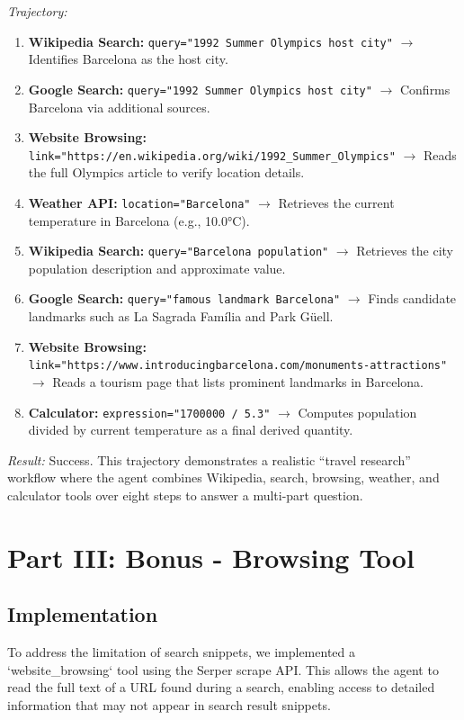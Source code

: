 \documentclass{article}
\begin{document}
\textit{Trajectory:}
\begin{enumerate}
    \item \textbf{Wikipedia Search:} \texttt{query="1992 Summer Olympics host city"} $\rightarrow$ Identifies Barcelona as the host city.
    \item \textbf{Google Search:} \texttt{query="1992 Summer Olympics host city"} $\rightarrow$ Confirms Barcelona via additional sources.
    \item \textbf{Website Browsing:} \texttt{link="https://en.wikipedia.org/wiki/1992\_Summer\_Olympics"} $\rightarrow$ Reads the full Olympics article to verify location details.
    \item \textbf{Weather API:} \texttt{location="Barcelona"} $\rightarrow$ Retrieves the current temperature in Barcelona (e.g., 10.0°C).
    \item \textbf{Wikipedia Search:} \texttt{query="Barcelona population"} $\rightarrow$ Retrieves the city population description and approximate value.
    \item \textbf{Google Search:} \texttt{query="famous landmark Barcelona"} $\rightarrow$ Finds candidate landmarks such as La Sagrada Família and Park Güell.
    \item \textbf{Website Browsing:} \texttt{link="https://www.introducingbarcelona.com/monuments-attractions"} $\rightarrow$ Reads a tourism page that lists prominent landmarks in Barcelona.
    \item \textbf{Calculator:} \texttt{expression="1700000 / 5.3"} $\rightarrow$ Computes population divided by current temperature as a final derived quantity.
\end{enumerate}

\textit{Result:} Success. This trajectory demonstrates a realistic ``travel research'' workflow where the agent combines Wikipedia, search, browsing, weather, and calculator tools over eight steps to answer a multi-part question.

\section{Part III: Bonus - Browsing Tool}

\subsection{Implementation}

To address the limitation of search snippets, we implemented a `website\_browsing` tool using the Serper scrape API. This allows the agent to read the full text of a URL found during a search, enabling access to detailed information that may not appear in search result snippets.
\end{document}
